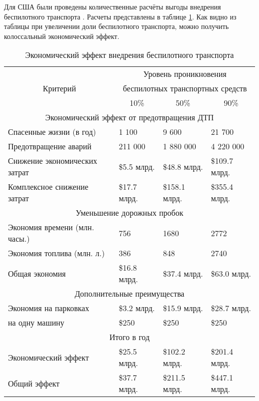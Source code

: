 Для США были проведены количественные расчёты выгоды внедрения беспилотного 
транспорта \cite{Pilotless_Efimov}. Расчеты представлены в таблице 
\ref{tbl:economics_effect}. Как видно из таблицы при увеличении доли 
беспилотного транспорта, можно получить колоссальный экономический 
эффект.

\begin{table} [htbp]
  \caption{Экономический эффект внедрения беспилотного транспорта}
  \label{tbl:economics_effect}
  \begin{SingleSpace}
    \begin{tabular}{| l | l | l | l |}
      \hline
                                     & \multicolumn{3}{|c|}{Уровень проникновения} \\
      \multicolumn{1}{|c|}{Критерий} & \multicolumn{3}{|c|}{беспилотных транспортных средств} \\
      \cline{2-4}
      & \multicolumn{1}{|c|}{10\%} & \multicolumn{1}{|c|}{50\%} & \multicolumn{1}{|c|}{90\%} \\
      \hline
      \multicolumn{4}{|c|}{Экономический эффект от предотвращения ДТП} \\
      \hline
      Спасенные жизни (в год)       & 1 100        & 9 600         & 21 700        \\
      Предотвращение аварий         & 211 000      & 1 880 000     & 4 220 000     \\
      Снижение экономических затрат & \$5.5 млрд.  & \$48.8 млрд.  & \$109.7 млрд. \\
      Комплексное снижение затрат   & \$17.7 млрд. & \$158.1 млрд. & \$355.4 млрд. \\
      \hline
      \multicolumn{4}{|c|}{Уменьшение дорожных пробок} \\
      \hline
      Экономия времени (млн. часы.) & 756          & 1680          & 2772          \\
      Экономия топлива (млн. л.)    & 386          & 848           & 2740          \\
      Общая экономия                & \$16.8 млрд. & \$37.4 млрд.  & \$63.0 млрд.  \\
      \hline
      \multicolumn{4}{|c|}{Дополнительные преимущества} \\
      \hline
      Экономия на парковках         & \$3.2 млрд.  & \$15.9 млрд.  & \$28.7 млрд.  \\
      на одну машину                & \$250        & \$250         & \$250         \\
      \hline
      \multicolumn{4}{|c|}{Итого в год} \\
      \hline
      Экономический эффект          & \$25.5 млрд. & \$102.2 млрд. & \$201.4 млрд. \\
      Общий эффект                  & \$37.7 млрд. & \$211.5 млрд. & \$447.1 млрд. \\
      \hline
    \end{tabular}
  \end{SingleSpace}
\end{table}

